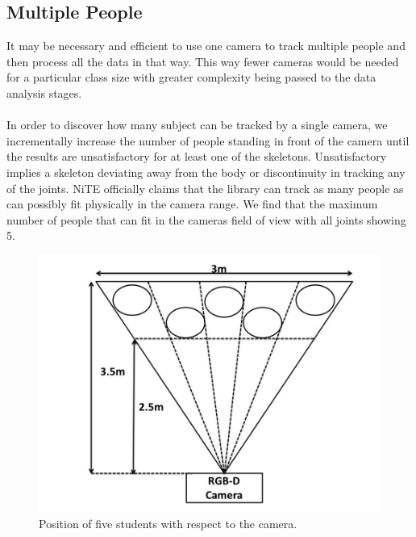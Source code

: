 \documentclass[a4paper]{article}
\begin{document}
\subsection{Multiple People}

\noindent
It may be necessary and efficient to use one camera to track multiple people and then process all the data in that way. This way fewer cameras would be needed for a particular class size with greater complexity being passed to the data analysis stages. \\\\
\noindent
In order to discover how many subject can be tracked by a single camera, we incrementally increase the number of people standing in front of the camera until the results are unsatisfactory for at least one of the skeletons. Unsatisfactory implies a skeleton deviating away from the body or discontinuity in tracking any of the joints. NiTE officially claims that the library can track as many people as can possibly fit physically in the camera range. We find that the maximum number of people that can fit in the cameras field of view with all joints showing 5. \\
 
\begin{figure}[H]
\centering
\includegraphics[scale=0.3]{multi_people1.jpg}
\caption{Position of five students with respect to the camera.}
\label{people_pos}
\end{figure}
 
\end{document}
